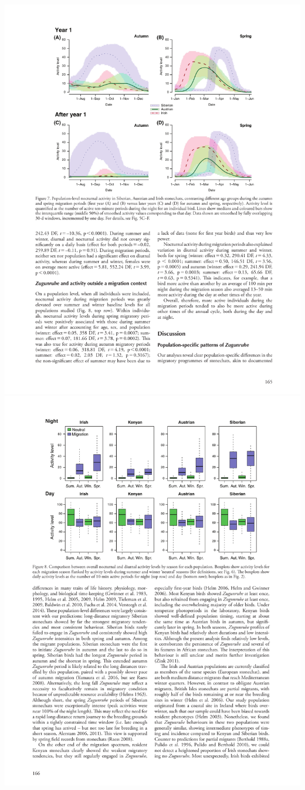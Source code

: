\documentclass[a4paper, twoside]{templates/ociamthesis}
\begin{document}
\includegraphics[width=1\linewidth]{pdf_chapters/zug/zug_crop_Part11}
\includegraphics[width=1\linewidth]{pdf_chapters/zug/zug_crop_Part12}
\end{document}
